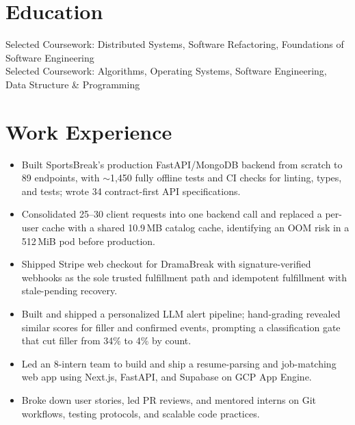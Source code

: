 \documentclass[11pt, letterpaper]{article}
\begin{document}

\section{Education}
Selected Coursework: Distributed Systems, Software Refactoring, Foundations of Software Engineering\\[1pt]
Selected Coursework: Algorithms, Operating Systems, Software Engineering, Data Structure \& Programming

\section{Work Experience}
\begin{itemize}
  \item Built SportsBreak's production FastAPI/MongoDB backend from scratch to 89 endpoints, with $\sim$1{,}450 fully offline tests and CI checks for linting, types, and tests; wrote 34 contract-first API specifications.
  \item Consolidated 25--30 client requests into one backend call and replaced a per-user cache with a shared 10.9\,MB catalog cache, identifying an OOM risk in a 512\,MiB pod before production.
  \item Shipped Stripe web checkout for DramaBreak with signature-verified webhooks as the sole trusted fulfillment path and idempotent fulfillment with stale-pending recovery.
  \item Built and shipped a personalized LLM alert pipeline; hand-grading revealed similar scores for filler and confirmed events, prompting a classification gate that cut filler from 34\% to 4\% by count.
\end{itemize}

\vspace{1pt}
\begin{itemize}
  \item Led an 8-intern team to build and ship a resume-parsing and job-matching web app using Next.js, FastAPI, and Supabase on GCP App Engine.
  \item Broke down user stories, led PR reviews, and mentored interns on Git workflows, testing protocols, and scalable code practices.
\end{itemize}
\end{document}
